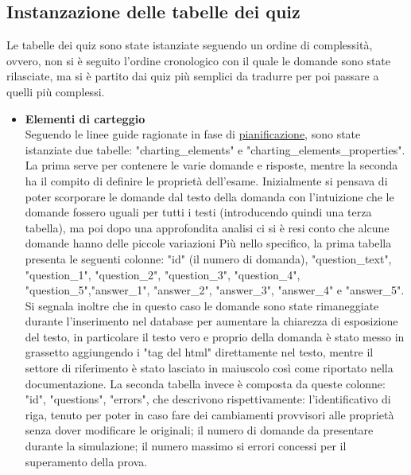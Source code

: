 \subsection{Instanzazione delle tabelle dei quiz}
Le tabelle dei quiz sono state istanziate seguendo un ordine di complessità, ovvero, non si è seguito l'ordine cronologico con il quale le domande sono state rilasciate, ma si è partito dai quiz più semplici da tradurre per poi passare a quelli più complessi.\\
\begin{itemize}
	\item \textbf{Elementi di carteggio}\\
	Seguendo le linee guide ragionate in fase di  \hyperref[cap:Introduzione]{pianificazione}, sono state istanziate due tabelle: "charting_elements" e  "charting_elements_properties". La prima serve per contenere le varie domande e risposte, mentre la seconda ha il compito di definire le proprietà dell'esame. Inizialmente si pensava di poter scorporare le domande dal testo della domanda con l'intuizione che le domande fossero uguali per tutti i testi (introducendo quindi una terza tabella), ma poi dopo una approfondita analisi ci si è resi conto che alcune domande hanno delle piccole variazioni 
	Più nello specifico, la prima tabella presenta le seguenti colonne: "id" (il numero di domanda), "question_text", "question_1", "question_2", "question_3", "question_4", "question_5","answer_1", "answer_2", "answer_3", "answer_4" e "answer_5". Si segnala inoltre che in questo caso le domande sono state rimaneggiate durante l'inserimento nel database per aumentare la chiarezza di esposizione del testo, in particolare il testo vero e proprio della domanda è stato messo in grassetto aggiungendo i "tag del html" direttamente nel testo, mentre il settore di riferimento è stato lasciato in maiuscolo così come riportato nella documentazione. La seconda tabella invece è composta da queste colonne: "id", "questions", "errors", che descrivono rispettivamente: l'identificativo di riga, tenuto per poter in caso fare dei cambiamenti provvisori alle proprietà senza dover modificare le originali; il numero di domande da presentare durante la simulazione; il numero massimo si errori concessi per il superamento della prova. 
	

\end{itemize}
